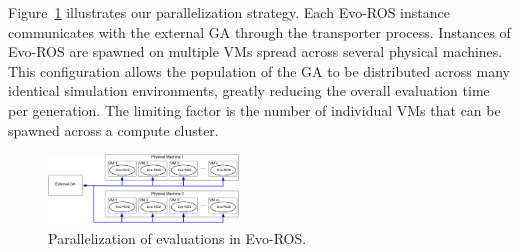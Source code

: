 Figure~\ref{evo_multiple} illustrates
our parallelization strategy.
%
Each Evo-ROS instance communicates with the external GA through the transporter process.
%
Instances of Evo-ROS are spawned on multiple VMs spread across several physical machines. 
%
This configuration allows the population of 
the GA to be distributed across many identical simulation environments,
greatly reducing the overall evaluation time per generation.
%
The limiting factor is the number of individual VMs that can be 
spawned across a compute cluster.
\begin{figure}[ht]
	\centering
    \includegraphics[width=0.45\textwidth]{Figures/evo_ros_distro_setup.PNG}
    \caption{Parallelization of evaluations in Evo-ROS.}
    \label{evo_multiple}
    \vspace{-0.1in}
\end{figure}

